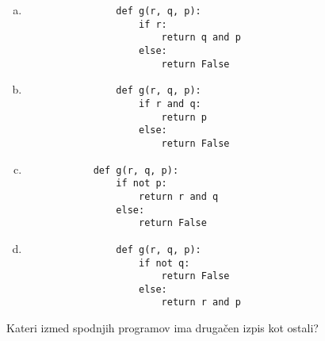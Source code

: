 \documentclass[arhiv, 10pt]{../izpit}
\begin{document}
        \begin{multicols}{2}
        \begin{enumerate}[(a)]
\item 
                \begin{verbatim}
                def g(r, q, p):
                    if r:
                        return q and p
                    else:
                        return False
                \end{verbatim}
            
\item 
                \begin{verbatim}
                def g(r, q, p):
                    if r and q:
                        return p
                    else:
                        return False
                \end{verbatim}
            
\item 
            \begin{verbatim}
            def g(r, q, p):
                if not p:
                    return r and q
                else:
                    return False
            \end{verbatim}
        
\item 
                \begin{verbatim}
                def g(r, q, p):
                    if not q:
                        return False
                    else:
                        return r and p
                \end{verbatim}
            
\end{enumerate}

        \end{multicols}
    
        \naloga*
        
        Kateri izmed spodnjih programov ima drugačen izpis kot ostali?
    
\end{document}
